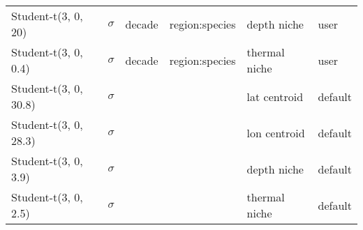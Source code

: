 \begin{table}
\begin{tabular}[t]{llllll}
Student-t(3, 0, 20) & $\sigma$ & decade & region:species & depth niche & user\\
\addlinespace
Student-t(3, 0, 0.4) & $\sigma$ & decade & region:species & thermal niche & user\\
Student-t(3, 0, 30.8) & $\sigma$ &  &  & lat centroid & default\\
Student-t(3, 0, 28.3) & $\sigma$ &  &  & lon centroid & default\\
Student-t(3, 0, 3.9) & $\sigma$ &  &  & depth niche & default\\
Student-t(3, 0, 2.5) & $\sigma$ &  &  & thermal niche & default\\
\bottomrule
\end{tabular}
\end{table}
